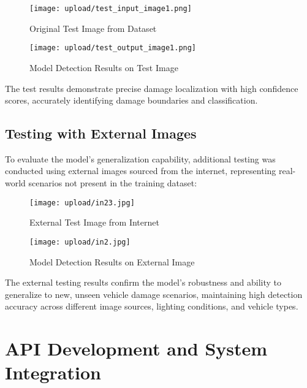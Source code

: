 \documentclass[12pt,a4paper]{report}
\begin{document}
\begin{figure}[H]
    \centering
    \begin{minipage}{0.45\textwidth}
        \centering
        \texttt{[image: upload/test\_input\_image1.png]}
        \caption{Original Test Image from Dataset}
        \label{fig:test_input1}
    \end{minipage}
    \hfill
    \begin{minipage}{0.45\textwidth}
        \centering
        \texttt{[image: upload/test\_output\_image1.png]}
        \caption{Model Detection Results on Test Image}
        \label{fig:test_output1}
    \end{minipage}
\end{figure}

The test results demonstrate precise damage localization with high confidence scores, accurately identifying damage boundaries and classification.

\subsection{Testing with External Images}

To evaluate the model's generalization capability, additional testing was conducted using external images sourced from the internet, representing real-world scenarios not present in the training dataset:

\begin{figure}[H]
    \centering
    \begin{minipage}{0.45\textwidth}
        \centering
        \texttt{[image: upload/in23.jpg]}
        \caption{External Test Image from Internet}
        \label{fig:external_input1}
    \end{minipage}
    \hfill
    \begin{minipage}{0.45\textwidth}
        \centering
        \texttt{[image: upload/in2.jpg]}
        \caption{Model Detection Results on External Image}
        \label{fig:external_output1}
    \end{minipage}
\end{figure}

The external testing results confirm the model's robustness and ability to generalize to new, unseen vehicle damage scenarios, maintaining high detection accuracy across different image sources, lighting conditions, and vehicle types.


\section{API Development and System Integration}
\end{document}
